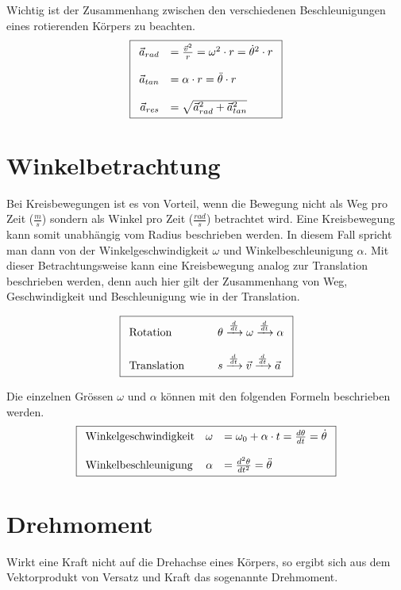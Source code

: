 \noindent
Wichtig ist der Zusammenhang zwischen den verschiedenen Beschleunigungen
eines rotierenden Körpers zu beachten.
\[ \boxed{\begin{array}{r l}
	\vec{a}_{rad} & = \frac{\vec{v}^2}{r} 
		= \omega^2 \cdot r 
		= \dot{\theta}^2 \cdot r \\
	& \\
	\vec{a}_{tan} & = \alpha \cdot r
		= \ddot{\theta} \cdot r \\
	& \\
	\vec{a}_{res} & = \sqrt{\vec{a}_{rad}^2 + \vec{a}_{tan}^2} 
\end{array} }\]

\section{Winkelbetrachtung}\label{sec:winkelbetrachtung}
Bei Kreisbewegungen ist es von Vorteil, wenn die Bewegung nicht als
Weg pro Zeit ($\frac{m}{s}$) sondern als Winkel pro Zeit 
($\frac{rad}{s}$) betrachtet wird. Eine Kreisbewegung kann somit 
unabhängig vom Radius beschrieben werden. In diesem Fall spricht
man dann von der Winkelgeschwindigkeit $\omega$ und 
Winkelbeschleunigung $\alpha$. Mit dieser Betrachtungsweise kann
eine Kreisbewegung analog zur Translation beschrieben werden, denn
auch hier gilt der Zusammenhang von Weg, Geschwindigkeit und 
Beschleunigung wie in der Translation.

\[ \boxed{ \begin{array}{l l}
	\text{Rotation} \qquad &
		\theta
		\xrightarrow{\frac{d}{dt}} \omega 
		\xrightarrow{\frac{d}{dt}} \alpha \\
	& \\
	\text{Translation} \qquad &
		s
		\xrightarrow{\frac{d}{dt}} \vec{v} 
		\xrightarrow{\frac{d}{dt}} \vec{a}
\end{array} }\]

\noindent
Die einzelnen Grössen $\omega$ und $\alpha$ können mit den folgenden 
Formeln beschrieben werden.
\[ \boxed{\begin{array}{l r l}
	\text{Winkelgeschwindigkeit} &
		\omega & = \omega_0 + \alpha \cdot t 
			= \frac{d\theta}{dt} 
			= \dot{\theta} \\
	& & \\
	\text{Winkelbeschleunigung} &
		\alpha & = \frac{d^2\theta}{dt^2} = \ddot{\theta}
\end{array} }\]

\section{Drehmoment}
Wirkt eine Kraft nicht auf die Drehachse eines Körpers, so ergibt
sich aus dem Vektorprodukt von Versatz und Kraft das sogenannte
Drehmoment.

